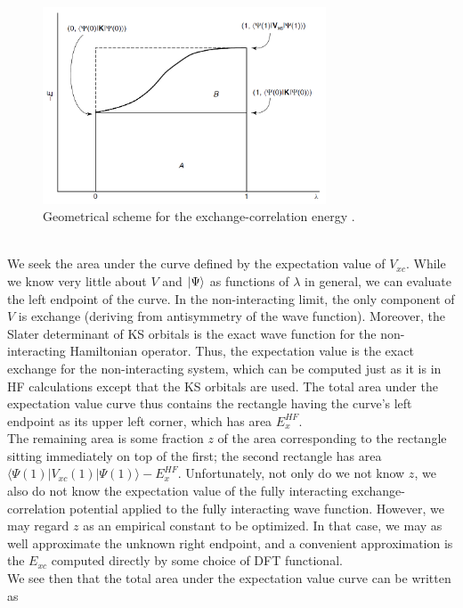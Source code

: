 \begin{figure}[ht]
  \centering
  \includegraphics[width=0.75\textwidth]{figures/Adiabatic connection method.png}
  \caption{Geometrical scheme for the exchange-correlation energy \cite{Cramer2004Sep}.} \label{Adiabatic connection method}
\end{figure} \\
We seek the area under the curve defined by the expectation value of $V_{xc}$. While we know very little about $V$ and $\ket{\Psi}$ as functions of $\lambda$ in general, we can evaluate the left endpoint of the curve. In the non-interacting limit, the only component of $V$ is exchange (deriving from antisymmetry of the wave function). Moreover, the Slater determinant of KS orbitals is the exact wave function for the non-interacting Hamiltonian operator. Thus, the expectation value is the exact exchange for the non-interacting system, which can be computed just as it is in HF calculations except that the KS orbitals are used. The total area under the expectation value curve thus contains the rectangle having the curve’s left endpoint as its upper left corner, which has area $E_x^{HF}$. \\
The remaining area is some fraction $z$ of the area corresponding to the rectangle sitting immediately on top of the first; the second rectangle has area $\langle\Psi(1)|V_{xc}(1)|\Psi(1)\rangle - E_x^{HF}$. Unfortunately, not only do we not know $z$, we also do not know the expectation value of the fully interacting exchange-correlation potential applied to the fully interacting wave function. However, we may regard $z$ as an empirical constant to be optimized. In that case, we may as well approximate the unknown right endpoint, and a convenient approximation is the $E_{xc}$ computed directly by some choice of DFT functional. \\
We see then that the total area under the expectation value curve can be written as
